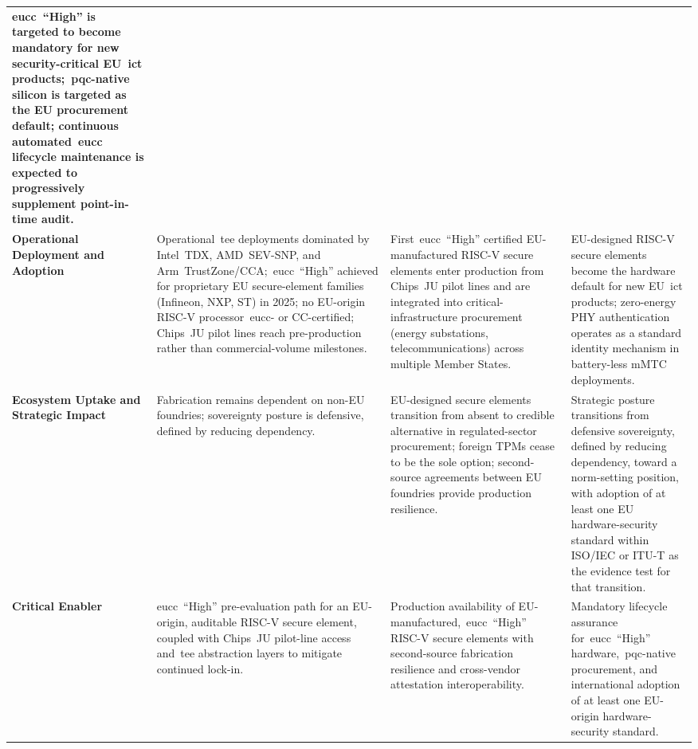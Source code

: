 \documentclass{ieeeaccess}
\begin{document}
\begin{table}[t]
\begin{tabularx}{\textwidth}{@{}>{\bfseries}p{} X X X@{}}
\gls{eucc}~``High'' is targeted to become mandatory for new security-critical EU~\gls{ict} products;~\gls{pqc}-native silicon is targeted as the EU procurement default; continuous automated~\gls{eucc} lifecycle maintenance is expected to progressively supplement point-in-time audit. \\
\addlinespace[2pt]
Operational Deployment and Adoption &
Operational~\gls{tee} deployments dominated by Intel~TDX, AMD~SEV-SNP, and Arm~TrustZone/CCA;~\gls{eucc}~``High'' achieved for proprietary EU secure-element families (Infineon, NXP, ST) in 2025; no EU-origin RISC-V processor~\gls{eucc}- or CC-certified; Chips~JU pilot lines reach pre-production rather than commercial-volume milestones. &
First~\gls{eucc}~``High'' certified EU-manufactured RISC-V secure elements enter production from Chips~JU pilot lines and are integrated into critical-infrastructure procurement (energy substations, telecommunications) across multiple Member States. &
EU-designed RISC-V secure elements become the hardware default for new EU~\gls{ict} products; zero-energy PHY authentication operates as a standard identity mechanism in battery-less mMTC deployments. \\
\addlinespace[2pt]
Ecosystem Uptake and Strategic Impact &
Fabrication remains dependent on non-EU foundries; sovereignty posture is defensive, defined by reducing dependency. &
EU-designed secure elements transition from absent to credible alternative in regulated-sector procurement; foreign TPMs cease to be the sole option; second-source agreements between EU foundries provide production resilience. &
Strategic posture transitions from defensive sovereignty, defined by reducing dependency, toward a norm-setting position, with adoption of at least one EU hardware-security standard within ISO/IEC or ITU-T as the evidence test for that transition. \\
\midrule
\textbf{Critical Enabler} &
\gls{eucc}~``High'' pre-evaluation path for an EU-origin, auditable RISC-V secure element, coupled with Chips~JU pilot-line access and~\gls{tee} abstraction layers to mitigate continued lock-in. &
Production availability of EU-manufactured,~\gls{eucc}~``High'' RISC-V secure elements with second-source fabrication resilience and cross-vendor attestation interoperability. &
Mandatory lifecycle assurance for~\gls{eucc}~``High'' hardware,~\gls{pqc}-native procurement, and international adoption of at least one EU-origin hardware-security standard. \\
\bottomrule
\end{tabularx}
\end{table}
\end{document}
